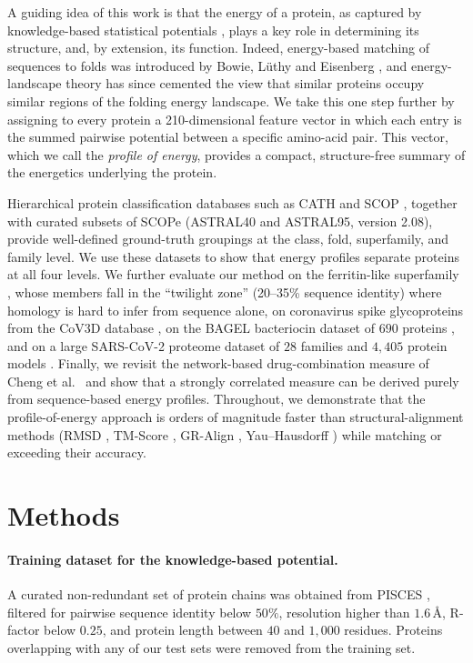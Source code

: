 \documentclass[11pt]{article}
\begin{document}
A guiding idea of this work is that the energy of a protein, as captured by knowledge-based statistical potentials \cite{sippl1990,krishnamoorthy2003four,singh1996delaunay}, plays a key role in determining its structure, and, by extension, its function. Indeed, energy-based matching of sequences to folds was introduced by Bowie, L\"uthy and Eisenberg \cite{bowie1991direct}, and energy-landscape theory \cite{onuchic1997theory} has since cemented the view that similar proteins occupy similar regions of the folding energy landscape. We take this one step further by assigning to every protein a 210-dimensional feature vector in which each entry is the summed pairwise potential between a specific amino-acid pair. This vector, which we call the \emph{profile of energy}, provides a compact, structure-free summary of the energetics underlying the protein.

Hierarchical protein classification databases such as CATH \cite{orengo1997cath} and SCOP \cite{murzin1995scop}, together with curated subsets of SCOPe \cite{chandonia2022astral} (ASTRAL40 and ASTRAL95, version 2.08), provide well-defined ground-truth groupings at the class, fold, superfamily, and family level. We use these datasets to show that energy profiles separate proteins at all four levels. We further evaluate our method on the ferritin-like superfamily \cite{lundin2012ferritin}, whose members fall in the ``twilight zone'' (20--35\% sequence identity) where homology is hard to infer from sequence alone, on coronavirus spike glycoproteins from the CoV3D database \cite{gowthaman2021cov3d}, on the BAGEL bacteriocin dataset of $690$ proteins \cite{vandeheuvel2018bagel}, and on a large SARS-CoV-2 proteome dataset of $28$ families and $4{,}405$ protein models \cite{freiberger2023frustration}. Finally, we revisit the network-based drug-combination measure of Cheng et al.~\cite{cheng2019network} and show that a strongly correlated measure can be derived purely from sequence-based energy profiles. Throughout, we demonstrate that the profile-of-energy approach is orders of magnitude faster than structural-alignment methods (RMSD \cite{kabsch1976rmsd}, TM-Score \cite{zhang2004tmscore}, GR-Align \cite{malod2015graligna}, Yau--Hausdorff \cite{tian2020hausdorff}) while matching or exceeding their accuracy.

\section{Methods}

\paragraph{Training dataset for the knowledge-based potential.} A curated non-redundant set of protein chains was obtained from PISCES \cite{wang2003pisces}, filtered for pairwise sequence identity below $50\%$, resolution higher than $1.6$\,{\AA}, R-factor below $0.25$, and protein length between $40$ and $1{,}000$ residues. Proteins overlapping with any of our test sets were removed from the training set.
\end{document}
